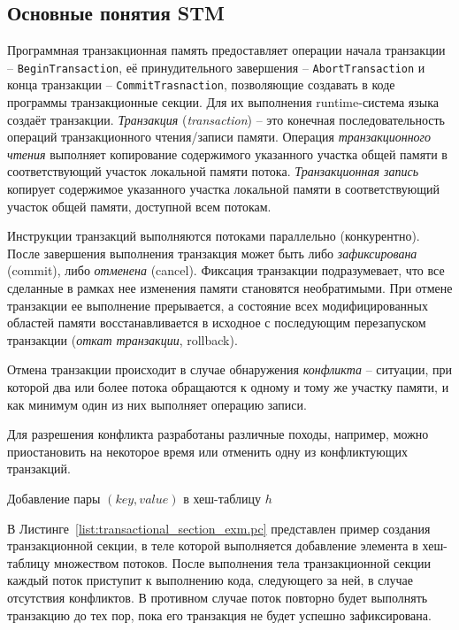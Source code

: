 \subsection{Основные понятия STM}
Программная транзакционная память предоставляет операции начала транзакции -- \texttt{BeginTransaction}, её принудительного завершения -- \texttt{AbortTransaction} и конца транзакции -- \texttt{CommitTrasnaction}, позволяющие создавать в коде программы транзакционные секции. Для их выполнения runtime-система языка создаёт транзакции. \textit{Транзакция} (\textit{transaction}) -- это конечная последовательность операций транзакционного чтения/записи памяти. Операция \textit{транзакционного чтения} выполняет копирование содержимого указанного участка общей памяти в соответствующий участок локальной памяти потока. \textit{Транзакционная запись} копирует содержимое указанного участка локальной памяти в соответствующий участок общей памяти, доступной всем потокам.

Инструкции транзакций выполняются потоками параллельно (конкурентно). После завершения выполнения транзакция может быть либо \textit{зафиксирована} (commit), либо \textit{отменена} (cancel). Фиксация транзакции подразумевает, что все сделанные в рамках нее изменения памяти становятся необратимыми. При отмене транзакции ее выполнение прерывается, а состояние всех модифицированных областей памяти восстанавливается в исходное с последующим перезапуском транзакции (\textit{откат транзакции}, rollback).

Отмена транзакции происходит в случае обнаружения \textit{конфликта} -- ситуации, при которой два или более потока обращаются к одному и тому же участку памяти, и как минимум один из них выполняет операцию записи.

Для разрешения конфликта разработаны различные походы, например, можно приостановить на некоторое время или отменить одну из конфликтующих транзакций.

\begin{ListingEnv}[!h]
	
    \caption{Добавление пары $(key, value)$ в хеш-таблицу $h$}
    \label{list:transactional_section_exm.pc}
\end{ListingEnv}

В Листинге~\ref{list:transactional_section_exm.pc} представлен пример создания транзакционной секции, в теле которой выполняется добавление элемента в хеш-таблицу множеством потоков. После выполнения тела транзакционной секции каждый поток приступит к выполнению кода, следующего за ней, в случае отсутствия конфликтов. В противном случае поток повторно будет выполнять транзакцию до тех пор, пока его транзакция не будет успешно зафиксирована.

